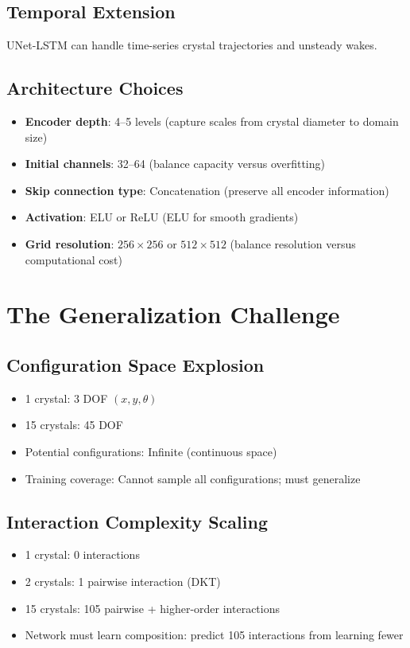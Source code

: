 \subsection{Temporal Extension}
UNet-LSTM can handle time-series crystal trajectories and unsteady wakes.

\subsection{Architecture Choices}
\begin{itemize}
    \item \textbf{Encoder depth}: 4--5 levels (capture scales from crystal diameter to domain size)
    \item \textbf{Initial channels}: 32--64 (balance capacity versus overfitting)
    \item \textbf{Skip connection type}: Concatenation (preserve all encoder information)
    \item \textbf{Activation}: ELU or ReLU (ELU for smooth gradients)
    \item \textbf{Grid resolution}: $256 \times 256$ or $512 \times 512$ (balance resolution versus computational cost)
\end{itemize}

\section{The Generalization Challenge}

\subsection{Configuration Space Explosion}
\begin{itemize}
    \item 1 crystal: 3 DOF $(x, y, \theta)$
    \item 15 crystals: 45 DOF
    \item Potential configurations: Infinite (continuous space)
    \item Training coverage: Cannot sample all configurations; must generalize
\end{itemize}

\subsection{Interaction Complexity Scaling}
\begin{itemize}
    \item 1 crystal: 0 interactions
    \item 2 crystals: 1 pairwise interaction (DKT)
    \item 15 crystals: 105 pairwise + higher-order interactions
    \item Network must learn composition: predict 105 interactions from learning fewer
\end{itemize}

